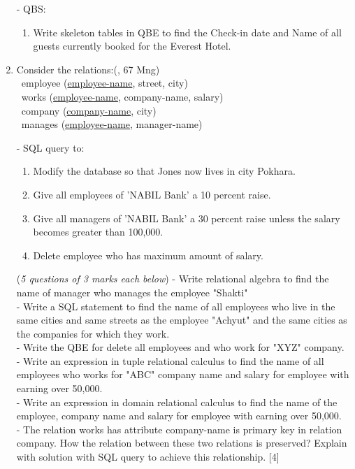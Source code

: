\documentclass[12pt]{article}
\newcommand{\enter}{\\\textcolor{white}{1}}
\begin{document}
\begin{enumerate}
        - QBS:
        \begin{enumerate}[noitemsep, topsep = 0pt, label = \alph*.]
            \item Write skeleton tables in QBE to find the Check-in date and Name of all guests currently booked for the Everest Hotel.
        \end{enumerate}

    \item Consider the relations:\hfill(, 67 Mng)
        \enter employee (\underline{employee-name}, street, city)
        \enter works (\underline{employee-name}, company-name, salary)
        \enter company (\underline{company-name}, city)
        \enter manages (\underline{employee-name}, manager-name)

        - SQL query to:
        \begin{enumerate}[noitemsep, topsep = 0pt, label = \alph*.]
            \item Modify the database so that Jones now lives in city Pokhara.
            \item Give all employees of 'NABIL Bank' a 10 percent raise.
            \item Give all managers of 'NABIL Bank' a 30 percent raise unless the salary becomes greater than 100,000.
            \item Delete employee who has maximum amount of salary.
        \end{enumerate}

        (\textit{5 questions of 3 marks each below})
        - Write relational algebra to find the name of manager who manages the employee "Shakti"\\
        - Write a SQL statement to find the name of all employees who live in the same cities and same streets as the employee "Achyut" and the same cities as the companies for which they work. \\
        - Write the QBE for delete all employees and who work for "XYZ" company.\\
        - Write an expression in tuple relational calculus to find the name of all employees who works for "ABC" company name and salary for employee with earning over 50,000.\\
        - Write an expression in domain relational calculus to find the name of the employee, company name and salary for employee with earning over 50,000.\\

        - The relation works has attribute company-name is primary key in relation company. How the relation between these two relations is preserved? Explain with solution with SQL query to achieve this relationship. \hfill[4]


\end{enumerate}
\end{document}
